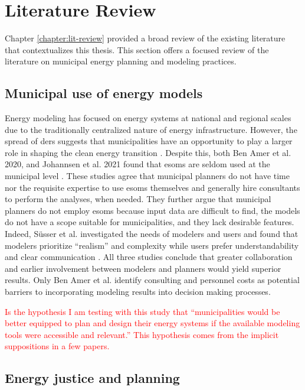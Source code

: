 \section{Literature Review}
Chapter \ref{chapter:lit-review} provided a broad review of the existing
literature that contextualizes this thesis. This section offers a focused review
of the literature on municipal energy planning and modeling practices.

\subsection{Municipal use of energy models}

Energy modeling has focused on energy systems at national and regional scales
due to the traditionally centralized nature of energy infrastructure. However,
the spread of \acp{der} suggests that municipalities have an opportunity to play
a larger role in shaping the clean energy transition
\cite{shen_facilitating_2021}. Despite this, both Ben Amer et al. 2020, and
Johannsen et al. 2021 found that \acp{esom} are seldom used at the municipal
level \cite{ben_amer_too_2020,johannsen_designing_2021}. These studies agree
that municipal planners do not have time nor the requisite expertise to use
\acp{esom} themselves and generally hire consultants to perform the analyses,
when needed. They further argue that municipal planners do not employ \acp{esom}
because input data are difficult to find, the models do not have a scope
suitable for municipalities, and they lack desirable features. Indeed,
S\"{u}sser et al. investigated the needs of modelers and users and found that
modelers prioritize ``realism'' and complexity while users prefer
understandability and clear communication \cite{susser_better_2022}. All three
studies conclude that greater collaboration and earlier involvement between
modelers and planners would yield superior results. Only Ben Amer et al.
identify consulting and personnel costs as potential barriers to incorporating
modeling results into decision making processes.

\textcolor{red}{Is the hypothesis I am testing with this study that
``municipalities would be better equipped to plan and design their energy
systems if the available modeling tools were accessible and relevant.'' This
hypothesis comes from the implicit suppositions in a few papers. }

\subsection{Energy justice and planning}

